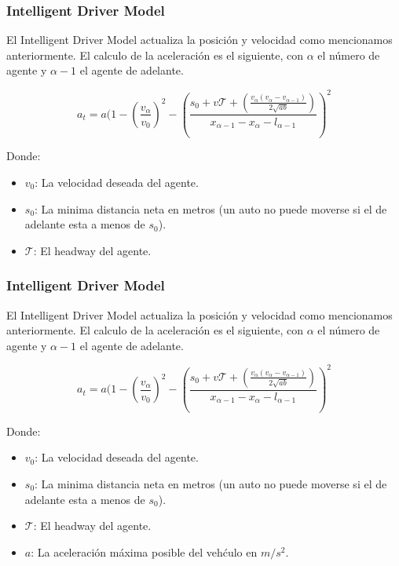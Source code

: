 \documentclass[10pt, compress]{beamer}
\begin{document}
\begin{frame}[fragile]

\frametitle{Intelligent Driver Model}
El Intelligent Driver Model actualiza la posici\'on y velocidad como mencionamos anteriormente. El calculo de la aceleraci\'on es el siguiente, con $\alpha$ el n\'umero de agente y $\alpha - 1$ el agente de adelante.

  \begin{equation*}
    a_t = a (1 - (\frac{v_\alpha}{v_0})^2 - (\frac{s_0 + v\mathcal{T} + (\frac{v_\alpha (v_\alpha - v_{\alpha-1})}{2\sqrt{ab}})}{x_{\alpha-1} - x_\alpha - l_{\alpha-1}})^2
  \end{equation*}

Donde:
\begin{itemize}
\item $v_0$: La velocidad deseada del agente.
\item $s_0$: La minima distancia neta en metros (un auto no puede moverse si el de adelante esta a menos de $s_0$).
\item $\mathcal{T}$: El headway del agente.
\end{itemize}

\end{frame}

\begin{frame}[fragile]

\frametitle{Intelligent Driver Model}
El Intelligent Driver Model actualiza la posici\'on y velocidad como mencionamos anteriormente. El calculo de la aceleraci\'on es el siguiente, con $\alpha$ el n\'umero de agente y $\alpha - 1$ el agente de adelante.

  \begin{equation*}
    a_t = a (1 - (\frac{v_\alpha}{v_0})^2 - (\frac{s_0 + v\mathcal{T} + (\frac{v_\alpha (v_\alpha - v_{\alpha-1})}{2\sqrt{ab}})}{x_{\alpha-1} - x_\alpha - l_{\alpha-1}})^2
  \end{equation*}

Donde:
\begin{itemize}
\item $v_0$: La velocidad deseada del agente.
\item $s_0$: La minima distancia neta en metros (un auto no puede moverse si el de adelante esta a menos de $s_0$).
\item $\mathcal{T}$: El headway del agente.
\item $a$: La aceleraci\'on m\'axima posible del veh\'culo en $m/s^2$.
\end{itemize}

\end{frame}
\end{document}

